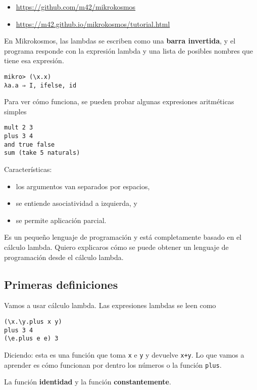 \documentclass[11pt]{article}
\begin{document}
\begin{itemize}
\item \url{https://github.com/m42/mikrokosmos}
\item \url{https://m42.github.io/mikrokosmos/tutorial.html}
\end{itemize}

En Mikrokosmos, las lambdas se escriben como una \textbf{barra invertida}, y
el programa responde con la expresión lambda y una lista de posibles
nombres que tiene esa expresión.

\begin{verbatim}
mikro> (\x.x)
λa.a ⇒ I, ifelse, id
\end{verbatim}

Para ver cómo funciona, se pueden probar algunas expresiones aritméticas
simples

\begin{verbatim}
mult 2 3
plus 3 4
and true false
sum (take 5 naturals)
\end{verbatim}

Características:

\begin{itemize}
\item los argumentos van separados por espacios,
\item se entiende asociatividad a izquierda, y
\item se permite aplicación parcial.
\end{itemize}

Es un pequeño lenguaje de programación y está completamente basado en el 
cálculo lambda. Quiero explicaros cómo se puede obtener un lenguaje de
programación desde el cálculo lambda.

\subsection*{Primeras definiciones}
\label{sec-14-3}
Vamos a usar cálculo lambda. Las expresiones lambdas se leen
como 

\begin{verbatim}
(\x.\y.plus x y)
plus 3 4
(\e.plus e e) 3
\end{verbatim}

Diciendo: esta es una función que toma \texttt{x} e \texttt{y} y devuelve \texttt{x+y}.
Lo que vamos a aprender es cómo funcionan por dentro los números
o la función \texttt{plus}.

La función \textbf{identidad} y la función \textbf{constantemente}.
\end{document}
